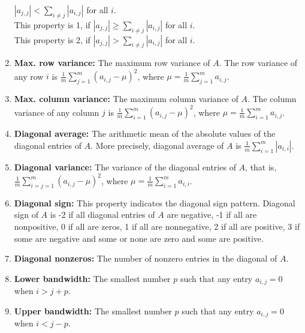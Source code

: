 \begin{enumerate}
$|a_{j,j}| < \sum_{i \neq j} |a_{i,j}|$  for all $i$.\\
This property is 1, if $|a_{j,j}| \geq \sum_{i \neq j} |a_{i,j}|$  for all $i$.\\
This property is 2, if $|a_{j,j}| > \sum_{i \neq j} |a_{i,j}|$  for all $i$.
\item \textbf{Max. row variance:} The maximum row variance of $A$. The row variance of any row $i$ is $\frac{1}{m}\sum_{j=1}^{m}(a_{i,j} - \mu)^{2}$, where $\mu = \frac{1}{m}\sum_{j=1}^{m} a_{i,j}$.
\item \textbf{Max. column variance:} The maximum column variance of $A$. The column variance of any column $j$ is $\frac{1}{m}\sum_{i=1}^{m}(a_{i,j} - \mu)^{2}$, where $\mu = \frac{1}{m}\sum_{i=1}^{m} a_{i,j}$.
\item \textbf{Diagonal average:} The arithmetic mean of the absolute values of the diagonal entries of $A$. More precisely, diagonal average of $A$ is $\frac{1}{m}\sum_{i=1}^{m} |a_{i,i}|$.
\item \textbf{Diagonal variance:} The variance of the diagonal entries of $A$, that is, $\frac{1}{m}\sum_{i=j=1}^{m}(a_{i,j} - \mu)^{2}$, where $\mu = \frac{1}{m}\sum_{i=1}^{m} a_{i,i}$.
\item \textbf{Diagonal sign:} This property indicates the diagonal sign pattern. Diagonal sign of $A$ is -2 if all diagonal entries of $A$ are negative, -1 if all are nonpositive, 0 if all are zeros, 1 if all are nonnegative, 2 if all are positive, 3 if some are negative and some or none are zero and some are positive.
\item \textbf{Diagonal nonzeros:} The number of nonzero entries in the diagonal of $A$.
\item \textbf{Lower bandwidth:} The smallest number $p$ such that any entry $a_{i,j} = 0$ when $i > j + p$.
\item \textbf{Upper bandwidth:} The smallest number $p$ such that any entry $a_{i,j} = 0$ when $i < j - p$.

\end{enumerate}

